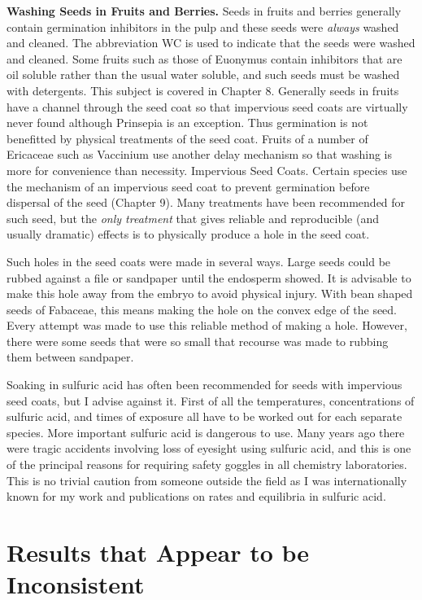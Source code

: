 \textbf{Washing Seeds in Fruits and Berries.} Seeds in fruits and berries
generally contain germination inhibitors in the pulp and these seeds were \textit{always}
washed and cleaned. The abbreviation WC is used to indicate that the seeds were
washed and cleaned. Some fruits such as those of Euonymus contain inhibitors that
are oil soluble rather than the usual water soluble, and such seeds must be washed
with detergents. This subject is covered in Chapter 8. Generally seeds in fruits have a
channel through the seed coat so that impervious seed coats are virtually never found
although Prinsepia is an exception. Thus germination is not benefitted by physical
treatments of the seed coat. Fruits of a number of Ericaceae such as Vaccinium use
another delay mechanism so that washing is more for convenience than necessity.
Impervious Seed Coats. Certain species use the mechanism of an
impervious seed coat to prevent germination before dispersal of the seed (Chapter 9).
Many treatments have been recommended for such seed, but the \textit{only treatment} that
gives reliable and reproducible (and usually dramatic) effects is to physically produce
a hole in the seed coat.

Such holes in the seed coats were made in several ways. Large seeds could
be rubbed against a file or sandpaper until the endosperm showed. It is advisable to
make this hole away from the embryo to avoid physical injury. With bean shaped
seeds of Fabaceae, this means making the hole on the convex edge of the seed.
Every attempt was made to use this reliable method of making a hole. However, there
were some seeds that were so small that recourse was made to rubbing them between
sandpaper.

Soaking in sulfuric acid has often been recommended for seeds with
impervious seed coats, but I advise against it. First of all the temperatures,
concentrations of sulfuric acid, and times of exposure all have to be worked out for
each separate species. More important sulfuric acid is dangerous to use. Many years
ago there were tragic accidents involving loss of eyesight using sulfuric acid, and this
is one of the principal reasons for requiring safety goggles in all chemistry
laboratories. This is no trivial caution from someone outside the field as I was
internationally known for my work and publications on rates and equilibria in sulfuric
acid.

\section{Results that Appear to be Inconsistent}

